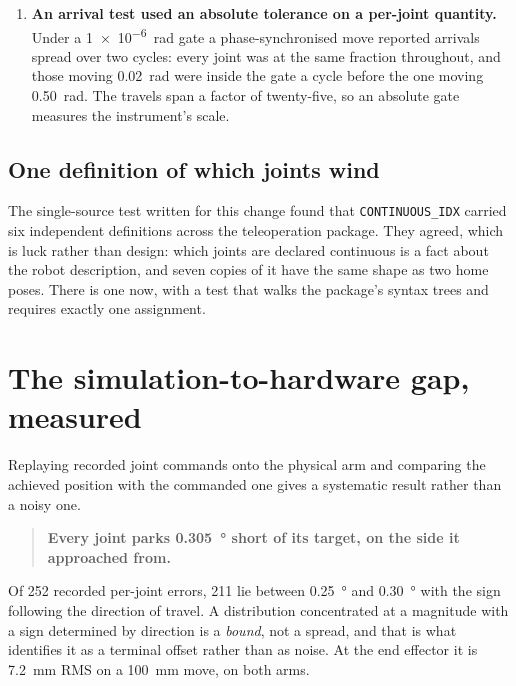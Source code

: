\begin{enumerate}
    measured \SI{0.0509}{\milli\metre} off it. The instrument's resolution was
    being reported as the robot's behaviour. Refined by bisection on the real
    forward kinematics, the same path reads \SI{9.4e-9}{\milli\metre}.
  \item \textbf{An arrival test used an absolute tolerance on a per-joint
    quantity.} Under a \SI{1e-6}{\radian} gate a phase-synchronised move
    reported arrivals spread over two cycles: every joint was at the same
    fraction throughout, and those moving \SI{0.02}{\radian} were inside the
    gate a cycle before the one moving \SI{0.50}{\radian}. The travels span a
    factor of twenty-five, so an absolute gate measures the instrument's
    scale.
\end{enumerate}

\subsection{One definition of which joints wind}

The single-source test written for this change found that
\texttt{CONTINUOUS\_IDX} carried six independent definitions across the
teleoperation package. They agreed, which is luck rather than design: which
joints are declared continuous is a fact about the robot description, and
seven copies of it have the same shape as two home poses. There is one now,
with a test that walks the package's syntax trees and requires exactly one
assignment.

\section{The simulation-to-hardware gap, measured}

Replaying recorded joint commands onto the physical arm and comparing the
achieved position with the commanded one gives a systematic result rather than
a noisy one.

\begin{quote}
\textbf{Every joint parks \SI{0.305}{\degree} short of its target, on the side
it approached from.}
\end{quote}

Of \num{252} recorded per-joint errors, \num{211} lie between
\SI{0.25}{\degree} and \SI{0.30}{\degree} with the sign following the
direction of travel. A distribution concentrated at a magnitude with a sign
determined by direction is a \emph{bound}, not a spread, and that is what
identifies it as a terminal offset rather than as noise. At the end effector
it is \SI{7.2}{\milli\metre} RMS on a \SI{100}{\milli\metre} move, on both
arms.


